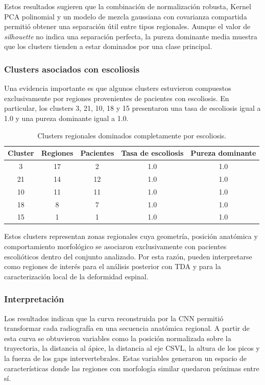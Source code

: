 \documentclass[conference]{IEEEtran}
\begin{document}
Estos resultados sugieren que la combinación de normalización robusta, Kernel PCA polinomial y un modelo de mezcla gaussiana con covarianza compartida permitió obtener una separación útil entre tipos regionales. Aunque el valor de \textit{silhouette} no indica una separación perfecta, la pureza dominante media muestra que los clusters tienden a estar dominados por una clase principal.

\subsubsection{Clusters asociados con escoliosis}

Una evidencia importante es que algunos clusters estuvieron compuestos exclusivamente por regiones provenientes de pacientes con escoliosis. En particular, los clusters 3, 21, 10, 18 y 15 presentaron una tasa de escoliosis igual a 1.0 y una pureza dominante igual a 1.0.

\begin{table}[H]
\centering
\caption{Clusters regionales dominados completamente por escoliosis.}
\label{tab:scoliosis_dominant_clusters}
\begin{tabular}{ccccc}
\hline
\textbf{Cluster} & \textbf{Regiones} & \textbf{Pacientes} & \textbf{Tasa de escoliosis} & \textbf{Pureza dominante} \\
\hline
3  & 17 & 2  & 1.0 & 1.0 \\
21 & 14 & 12 & 1.0 & 1.0 \\
10 & 11 & 11 & 1.0 & 1.0 \\
18 & 8  & 7  & 1.0 & 1.0 \\
15 & 1  & 1  & 1.0 & 1.0 \\
\hline
\end{tabular}
\end{table}

Estos clusters representan zonas regionales cuya geometría, posición anatómica y comportamiento morfológico se asociaron exclusivamente con pacientes escolióticos dentro del conjunto analizado. Por esta razón, pueden interpretarse como regiones de interés para el análisis posterior con TDA y para la caracterización local de la deformidad espinal.

\subsubsection{Interpretación}

Los resultados indican que la curva reconstruida por la CNN permitió transformar cada radiografía en una secuencia anatómica regional. A partir de esta curva se obtuvieron variables como la posición normalizada sobre la trayectoria, la distancia al ápice, la distancia al eje CSVL, la altura de los picos y la fuerza de los gaps intervertebrales. Estas variables generaron un espacio de características donde las regiones con morfología similar quedaron próximas entre sí.
\end{document}
